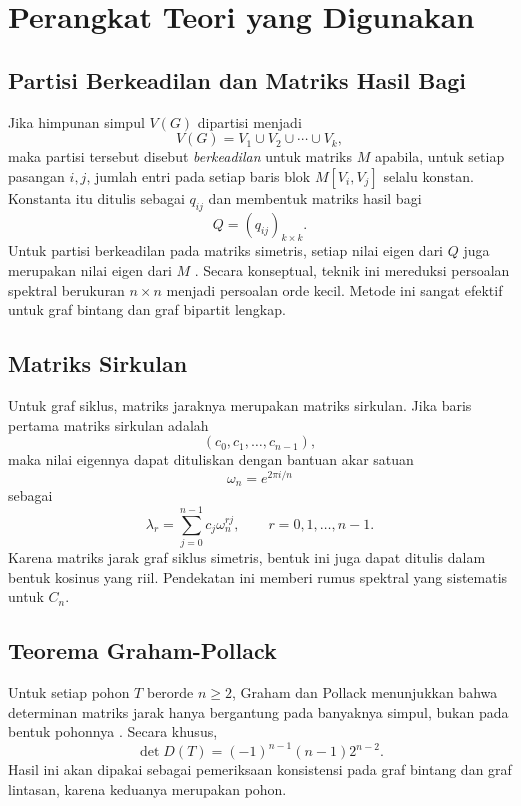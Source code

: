 \documentclass[12pt,a4paper]{article}
\begin{document}
\section{Perangkat Teori yang Digunakan}

\subsection{Partisi Berkeadilan dan Matriks Hasil Bagi}

Jika himpunan simpul $V(G)$ dipartisi menjadi
\[
  V(G)=V_1\cup V_2\cup \cdots \cup V_k,
\]
maka partisi tersebut disebut \textit{berkeadilan} untuk matriks $M$ apabila, untuk setiap pasangan $i,j$, jumlah entri pada setiap baris blok $M[V_i,V_j]$ selalu konstan. Konstanta itu ditulis sebagai $q_{ij}$ dan membentuk matriks hasil bagi
\[
  Q=(q_{ij})_{k\times k}.
\]
Untuk partisi berkeadilan pada matriks simetris, setiap nilai eigen dari $Q$ juga merupakan nilai eigen dari $M$ \cite{godsil2001algebraic}. Secara konseptual, teknik ini mereduksi persoalan spektral berukuran $n\times n$ menjadi persoalan orde kecil. Metode ini sangat efektif untuk graf bintang dan graf bipartit lengkap.

\subsection{Matriks Sirkulan}

Untuk graf siklus, matriks jaraknya merupakan matriks sirkulan. Jika baris pertama matriks sirkulan adalah
\[
  (c_0,c_1,\dots,c_{n-1}),
\]
maka nilai eigennya dapat dituliskan dengan bantuan akar satuan
\[
  \omega_n=e^{2\pi i/n}
\]
sebagai
\[
  \lambda_r=\sum_{j=0}^{n-1} c_j \omega_n^{rj},
  \qquad
  r=0,1,\dots,n-1.
\]
Karena matriks jarak graf siklus simetris, bentuk ini juga dapat ditulis dalam bentuk kosinus yang riil. Pendekatan ini memberi rumus spektral yang sistematis untuk $C_n$.

\subsection{Teorema Graham-Pollack}

Untuk setiap pohon $T$ berorde $n\ge 2$, Graham dan Pollack menunjukkan bahwa determinan matriks jarak hanya bergantung pada banyaknya simpul, bukan pada bentuk pohonnya \cite{graham1971addressing, graham1978distance}. Secara khusus,
\[
  \det D(T)=(-1)^{n-1}(n-1)2^{n-2}.
\]
Hasil ini akan dipakai sebagai pemeriksaan konsistensi pada graf bintang dan graf lintasan, karena keduanya merupakan pohon.
\end{document}
